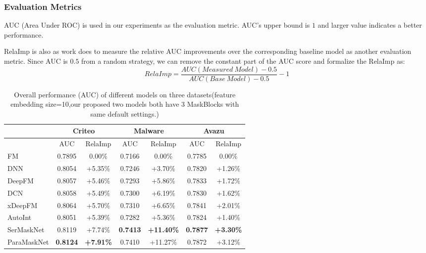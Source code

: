 \documentclass[sigconf]{acmart}
\begin{document}
\subsubsection{Evaluation Metrics}
AUC (Area Under ROC) is used in our experiments as the evaluation metric. AUC's upper bound is $1$ and larger value indicates a better performance.


RelaImp is also as work \cite{inproceedings} does to measure the relative AUC improvements over the corresponding baseline model as another evaluation metric. Since AUC is $0.5$ from a random strategy, we can remove the constant part of the AUC score and formalize the RelaImp as:
\begin{equation}
  RelaImp = \frac{AUC(Measured\ Model) - 0.5}{AUC(Base\ Model) - 0.5} - 1
\end{equation}

\begin{table*}
  \setlength{\abovecaptionskip}{1pt}
\centering
\caption{Overall performance (AUC) of different models on three datasets(feature embedding size=10,our proposed two models  both have 3 MaskBlocks  with same default settings.)}
\begin{tabular}{l|cccccc}
\toprule
  & \multicolumn{2}{c}{\textbf{Criteo}} &
  \multicolumn{2}{c}{\textbf{Malware}} & \multicolumn{2}{c}{\textbf{Avazu}} \\
\midrule
  & AUC & RelaImp   & AUC & RelaImp  & AUC & RelaImp \\
\midrule
FM & 0.7895 & 0.00\% & 0.7166 & 0.00\% & 0.7785 & 0.00\%\\
DNN & 0.8054 & +5.35\% & 0.7246 & +3.70\% & 0.7820 & +1.26\%\\
DeepFM & 0.8057 & +5.46\% & 0.7293 & +5.86\% & 0.7833 & +1.72\%\\
\midrule

DCN & 0.8058 & +5.49\% & 0.7300 & +6.19\% & 0.7830 & +1.62\%\\
xDeepFM & 0.8064 & +5.70\% & 0.7310 & +6.65\% & 0.7841 & +2.01\%\\
AutoInt & 0.8051 & +5.39\% & 0.7282 & +5.36\% & 0.7824 & +1.40\%\\
\midrule
SerMaskNet & 0.8119 & +7.74\% & \textbf{0.7413} & \textbf{+11.40\%} & \textbf{0.7877} & \textbf{+3.30\%}\\
ParaMaskNet & \textbf{0.8124} & \textbf{+7.91\%} & 0.7410 & +11.27\% & 0.7872 & +3.12\%\\
\bottomrule
\end{tabular}\label{tab:overalperformance}
\end{table*}
\end{document}
